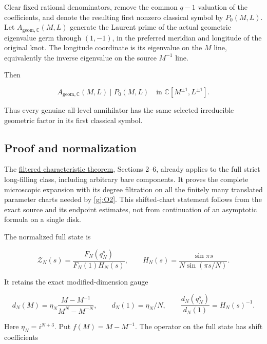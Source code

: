 Clear fixed rational denominators, remove the common \(q-1\)
valuation of the coefficients, and denote the resulting first nonzero
classical symbol by \(P_0(M,L)\). Let
\(A_{\mathrm{geom},\mathbb C}(M,L)\) generate the Laurent prime of the
actual geometric eigenvalue germ through \((1,-1)\), in the preferred
meridian and longitude of the original knot. The longitude coordinate
is its eigenvalue on the \(M\) line, equivalently the inverse
eigenvalue on the source \(M^{-1}\) line.

Then

\begin{equation}\label{gj:O3}
\boxed{\displaystyle
 A_{\mathrm{geom},\mathbb C}(M,L)\mid P_0(M,L)
 \quad\text{in }\mathbb C[M^{\pm1},L^{\pm1}].}
\end{equation}

Thus every genuine all-level annihilator has the same selected
irreducible geometric factor in its first classical symbol.

\subsection{Proof and normalization}\label{gj:proof-and-normalization}

The \href{https://sashakolpakov.github.io/murakamis_dream/notes/actual_main_meridian_filtered_characteristic.html}{filtered characteristic theorem},
Sections 2--6, already applies to the full strict long-filling class,
including arbitrary bare components. It proves the complete
microscopic expansion with its degree filtration on all the finitely
many translated parameter charts needed by \eqref{gj:O2}. This shifted-chart
statement follows from the exact source and its endpoint estimates,
not from continuation of an asymptotic formula on a single disk.

The normalized full state is

\begin{equation}\label{gj:O4}
\mathcal Z_N(s)=\frac{F_N(q_N^s)}{F_N(1)H_N(s)},\qquad
 H_N(s)=\frac{\sin\pi s}{N\sin(\pi s/N)}.
\end{equation}

It retains the exact modified-dimension gauge

\begin{equation}\label{gj:O5}
d_N(M)=\eta_N\frac{M-M^{-1}}{M^N-M^{-N}},\qquad
 d_N(1)=\eta_N/N,\qquad
 \frac{d_N(q_N^s)}{d_N(1)}=H_N(s)^{-1}.
\end{equation}

Here \(\eta_N=i^{N+3}\). Put \(f(M)=M-M^{-1}\). The operator on the
full state has shift coefficients

